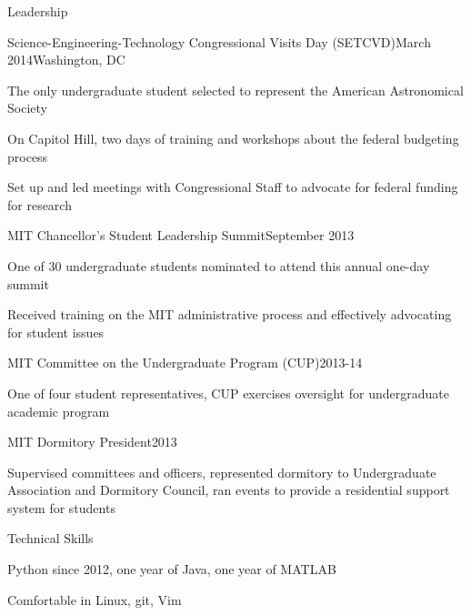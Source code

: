 \documentclass{resume} %
\begin{document}
\begin{rSection}{Leadership}

  \begin{rSubsection}{Science-Engineering-Technology Congressional Visits Day (SETCVD)}{March 2014}{}{Washington, DC}
  \item The only undergraduate student selected to represent the American Astronomical Society
  \item On Capitol Hill, two days of training and workshops about the federal budgeting process 
  \item Set up and led meetings with Congressional Staff to advocate for federal funding for research 
  \end{rSubsection}

\begin{rSubsection}{MIT Chancellor's Student Leadership Summit}{September 2013}{}{}
\item One of 30 undergraduate students nominated to attend this annual one-day summit
\item Received training on the MIT administrative process and effectively advocating for student issues 
\end{rSubsection}

\begin{rSubsection}{MIT Committee on the Undergraduate Program (CUP)}{2013-14}{}{}
\item One of four student representatives, CUP exercises oversight for undergraduate academic program
\end{rSubsection}

\begin{rSubsection}{MIT Dormitory President}{2013}{}{}
\item Supervised committees and officers, represented dormitory to Undergraduate Association and Dormitory Council, ran events to provide a residential support system for students
\end{rSubsection}

\end{rSection}

\begin{rSection}{Technical Skills}
\item Python since 2012, one year of Java, one year of MATLAB
\item Comfortable in Linux, git, Vim
\end{rSection}
\end{document}
